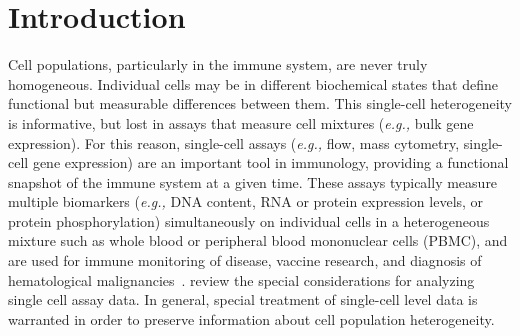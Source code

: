 \documentclass[12pt,oupdraft]{biostatistics}
\begin{document}
\clearpage
\section{Introduction}
\label{s:intro}
Cell populations, particularly in the immune system, are never truly homogeneous. Individual cells may be in different biochemical states that define functional but measurable differences between them. This single-cell heterogeneity is informative, but lost in assays that measure cell mixtures (\textit{e.g.,} bulk gene expression). For this reason, single-cell assays (\textit{e.g.,} flow, mass cytometry, single-cell gene expression) are an important tool in immunology, providing a functional snapshot of the immune system at a given time. These assays typically measure multiple biomarkers (\textit{e.g.,} DNA content, RNA or protein expression levels, or protein phosphorylation) simultaneously on individual cells in a heterogeneous mixture such as whole blood or peripheral blood mononuclear cells  (PBMC), and are used for immune monitoring of disease, vaccine research, and diagnosis of hematological malignancies~\citep{Altman:1996wf,Betts:2006dw,Inokuma:2007tn}. \citet{McDavid2012} review the special considerations for analyzing single cell assay data. In general, special treatment of single-cell level data is warranted in order to preserve information about cell population heterogeneity.
%
\end{document}
